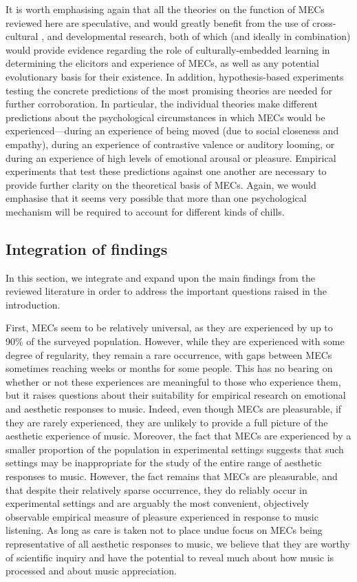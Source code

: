 It is worth emphasising again that all the theories on the function of MECs reviewed here are speculative, and would greatly benefit from the use of cross-cultural \parencite[see][]{beier2020}, and developmental research, both of which (and ideally in combination) would provide evidence regarding the role of culturally-embedded learning in determining the elicitors and experience of MECs, as well as any potential evolutionary basis for their existence. In addition, hypothesis-based experiments testing the concrete predictions of the most promising theories are needed for further corroboration. In particular, the individual theories make different predictions about the psychological circumstances in which MECs would be experienced---during an experience of being moved (due to social closeness and empathy), during an experience of contrastive valence or auditory looming, or during an experience of high levels of emotional arousal or pleasure. Empirical experiments that test these predictions against one another are necessary to provide further clarity on the theoretical basis of MECs. Again, we would emphasise that it seems very possible that more than one psychological mechanism will be required to account for different kinds of chills.

\subsection{Integration of findings}

In this section, we integrate and expand upon the main findings from the reviewed literature in order to address the important questions raised in the introduction.

First, MECs seem to be relatively universal, as they are experienced by up to 90\% of the surveyed population. However, while they are experienced with some degree of regularity, they remain a rare occurrence, with gaps between MECs sometimes reaching weeks or months for some people. This has no bearing on whether or not these experiences are meaningful to those who experience them, but it raises questions about their suitability for empirical research on emotional and aesthetic responses to music. Indeed, even though MECs are pleasurable, if they are rarely experienced, they are unlikely to provide a full picture of the aesthetic experience of music. Moreover, the fact that MECs are experienced by a smaller proportion of the population in experimental settings suggests that such settings may be inappropriate for the study of the entire range of aesthetic responses to music. However, the fact remains that MECs are pleasurable, and that despite their relatively sparse occurrence, they do reliably occur in experimental settings and are arguably the most convenient, objectively observable empirical measure of pleasure experienced in response to music listening. As long as care is taken not to place undue focus on MECs being representative of all aesthetic responses to music, we believe that they are worthy of scientific inquiry and have the potential to reveal much about how music is processed and about music appreciation.

